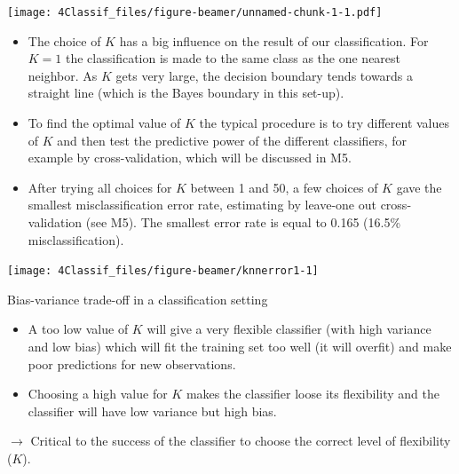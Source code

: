 \documentclass[10pt,ignorenonframetext,]{beamer}
\begin{document}
\begin{frame}

\texttt{[image: 4Classif\_files/figure-beamer/unnamed-chunk-1-1.pdf]}

\end{frame}

\begin{frame}

\begin{itemize}
\item
  The choice of \(K\) has a big influence on the result of our
  classification. For \(K=1\) the classification is made to the same
  class as the one nearest neighbor. As \(K\) gets very large, the
  decision boundary tends towards a straight line (which is the Bayes
  boundary in this set-up).
\item
  To find the optimal value of \(K\) the typical procedure is to try
  different values of \(K\) and then test the predictive power of the
  different classifiers, for example by cross-validation, which will be
  discussed in M5.
\item
  After trying all choices for \(K\) between 1 and 50, a few choices of
  \(K\) gave the smallest misclassification error rate, estimating by
  leave-one out cross-validation (see M5). The smallest error rate is
  equal to 0.165 (16.5\% misclassification).
\end{itemize}

\end{frame}

\begin{frame}

\begin{center}\texttt{[image: 4Classif\_files/figure-beamer/knnerror1-1]} \end{center}

\end{frame}

\begin{frame}

\begin{block}{Bias-variance trade-off in a classification setting}

\begin{itemize}
\item
  A too low value of \(K\) will give a very flexible classifier (with
  high variance and low bias) which will fit the training set too well
  (it will overfit) and make poor predictions for new observations.
\item
  Choosing a high value for \(K\) makes the classifier loose its
  flexibility and the classifier will have low variance but high bias.
\end{itemize}

\(\rightarrow\) Critical to the success of the classifier to choose the
correct level of flexibility (\(K\)).

\end{block}

\end{frame}
\end{document}
